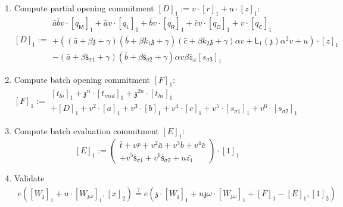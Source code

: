 \documentclass[11pt]{article} %
\newcommand{\chalpoint}{\ensuremath{\mathfrak{z}}\xspace}
\newcommand{\sigpolyevala}{\ensuremath{\mathsf{\bar{s}_{\sigma1}}}\xspace}
\newcommand{\sigpolyevalb}{\ensuremath{\mathsf{\bar{s}_{\sigma2}}}\xspace}
\newcommand{\lagrangepoly}{\ensuremath{\mathsf{L}}\xspace}
\newcommand{\sigcomma}{\ensuremath{[s_{\mathsf{\sigma1}}]_1}\xspace}
\newcommand{\sigcommb}{\ensuremath{[s_{\mathsf{\sigma2}}]_1}\xspace}
\newcommand{\sigcommc}{\ensuremath{[s_{\mathsf{\sigma3}}]_1}\xspace}
\newcommand{\selleftcomm}{\ensuremath{[q_\mathsf{L}]_1}\xspace}
\newcommand{\selrightcomm}{\ensuremath{[q_\mathsf{R}]_1}\xspace}
\newcommand{\seloutcomm}{\ensuremath{[q_\mathsf{O}]_1}\xspace}
\newcommand{\selconstcomm}{\ensuremath{[q_\mathsf{C}]_1}\xspace}
\newcommand{\selmultcomm}{\ensuremath{[q_\mathsf{M}]_1}\xspace}
\begin{document}
\begin{enumerate}
\item	Compute partial opening commitment $[D]_1 := v \cdot [r]_1 + u \cdot [z]_1:$
	$$
	[D]_1 :=
	\begin{array}{l}
	\bar{a}\bar{b} v \cdot \selmultcomm + \bar{a} v \cdot \selleftcomm + \bar{b}v \cdot \selrightcomm + \bar{c}v \cdot \seloutcomm +  v \cdot \selconstcomm \\
	+ \left( (\bar{a} + \beta \chalpoint + \gamma)(\bar{b} + \beta k_1 \chalpoint + \gamma)(\bar{c} + \beta k_2 \chalpoint + \gamma)\alpha v + \lagrangepoly_1(\chalpoint)\alpha^2 v + u\right) \cdot [z]_1\\
	-(\bar{a} + \beta \sigpolyevala + \gamma)(\bar{b} + \beta \sigpolyevalb + \gamma)\alpha v\beta \bar{z}_\omega \sigcommc \end{array}
	$$

	
	\item	Compute batch opening commitment $[F]_1:$
	$$
	[F]_1 := 	\begin{array}{l}
	[t_{lo}]_1
	+ \chalpoint^n \cdot [t_{mid}]_1
	+ \chalpoint^{2n} \cdot [t_{hi}]_1 \\
	+ [D]_1
	+ v^2 \cdot [a]_1
	+ v^3 \cdot [b]_1
	+ v^4 \cdot [c]_1
	+ v^5 \cdot \sigcomma
	+ v^6 \cdot \sigcommb
	\end{array}
	$$
\item 	Compute batch evaluation commitment $[E]_1$:
	$$
	[E]_1 :=
	\left( \begin{array}{l}
	\bar{t}
	+ v \bar{r}
	+ v^2 \bar{a}
	+ v^3 \bar{b}
	+ v^4 \bar{c} \\
	+ v^5 \sigpolyevala
	+ v^6 \sigpolyevalb
	+ u\bar{z_1}
	\end{array}
	\right)
	\cdot [1]_1
	$$
	\item Validate
	$$
	\begin{array}{c}
	e([W_\chalpoint]_1 + u \cdot [W_{\chalpoint \omega}]_1,  [x]_2)
	\overset{?}{=}
	e(\chalpoint \cdot [W_\chalpoint]_1 + u\chalpoint\omega \cdot [W_{\chalpoint \omega}]_1 + [F]_1 - [E]_1, [1]_2) \\
	\end{array}
	$$
\end{enumerate}
\end{document}
